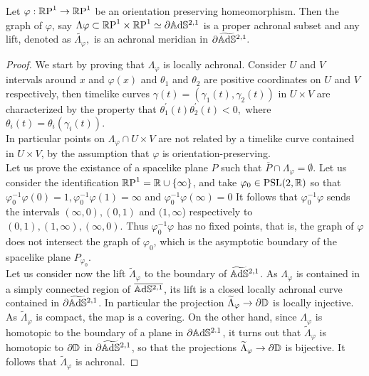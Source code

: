 \begin{lemma}
    Let $\varphi:\mathbb{R}\text{P}^1\to\mathbb{R}\text{P}^1$ be an orientation preserving homeomorphism. Then the graph of $\varphi$, say $\Lambda\varphi\subset \mathbb{R}\text{P}^1\times\mathbb{R}\text{P}^1\simeq\partial\mathbb{A}\mathrm{d}\mathbb{S}^{2,1}$ is a proper achronal subset and any lift, denoted as $\widetilde{\Lambda_\varphi},$ is an achronal meridian in $\partial\widetilde{\mathbb{A}\mathrm{d}\mathbb{S}}{}^{2,1}.$  
\end{lemma}
\begin{proof}
    We start by proving that $\Lambda_\varphi$ is locally achronal. Consider $U$ and $V$ intervals around $x$ and $\varphi(x)$ and $\theta_1$ and $\theta_2$ are positive coordinates on $U$ and $V$ respectively, then timelike curves $\gamma(t)=(\gamma_1(t),\gamma_2(t))$ in $U\times V$ are characterized by the property that $\theta_1^{\prime} (t)\theta_2^{\prime} (t)<0,$ where $\theta_i(t)=\theta_i(\gamma_i(t)).$ \\
    In particular points on $\Lambda_\varphi\cap U\times V$ are not related by a timelike curve contained in $U\times V$, by the assumption that $\varphi$ is orientation-preserving. \\
    Let us prove the existance of a spacelike plane $P$ such that $\overline{P}\cap \Lambda_\varphi=\emptyset.$ Let us consider the identification $\mathbb{R}\text{P}^1=\mathbb{R}\cup\{\infty\}$, and take $\varphi_0\in\text{PSL}(2,\mathbb{R})$ so that $\varphi_0^{-1}\varphi(0)=1, \varphi_0^{-1}\varphi(1)=\infty$ and $\varphi_0^{-1}\varphi(\infty)=0$ It follows that $\varphi_0^{-1}\varphi$ sends the intervals $(\infty,0), (0,1)$ and $(1,\infty$) respectively to $(0,1),(1,\infty),(\infty,0)$. Thus $\varphi_0^{-1}\varphi$ has no fixed points, that is, the graph of $\varphi$ does not intersect the graph of $\varphi_0$, which is the asymptotic boundary of the spacelike plane $P_{\varphi_0}.$\\
    Let us consider now the lift $\widetilde{\Lambda}_\varphi$ to the boundary of $\widetilde{\mathbb{A}\mathrm{d}\mathbb{S}}{}^{2,1}$. As $\Lambda_\varphi$ is contained in a simply connected region of $\overline{\mathbb{A}\mathrm{d}\mathbb{S}^{2,1}}$, its lift is a closed locally achronal curve contained in $\partial\widetilde{\mathbb{A}\mathrm{d}\mathbb{S}}{}^{2,1}$. In particular the projection $\widetilde{\Lambda}_\varphi\to\partial\mathbb{D}$ is locally injective. As $\widetilde{\Lambda}_\varphi$ is compact, the map is a covering. On the other hand, since $\Lambda_\varphi$ is homotopic to the boundary of a plane in $\partial\mathbb{A}\mathrm{d}\mathbb{S}^{2.1}$, it turns out that $\widetilde{\Lambda}_\varphi$ is homotopic to $\partial\mathbb{D}$ in $\partial\widetilde{\mathbb{A}\mathrm{d}\mathbb{S}}{}^{2,1}$, so that the projections $\widetilde{\Lambda}_\varphi\to\partial\mathbb{D}$ is bijective. It follows that $\widetilde{\Lambda}_\varphi$ is achronal.  
\end{proof}

